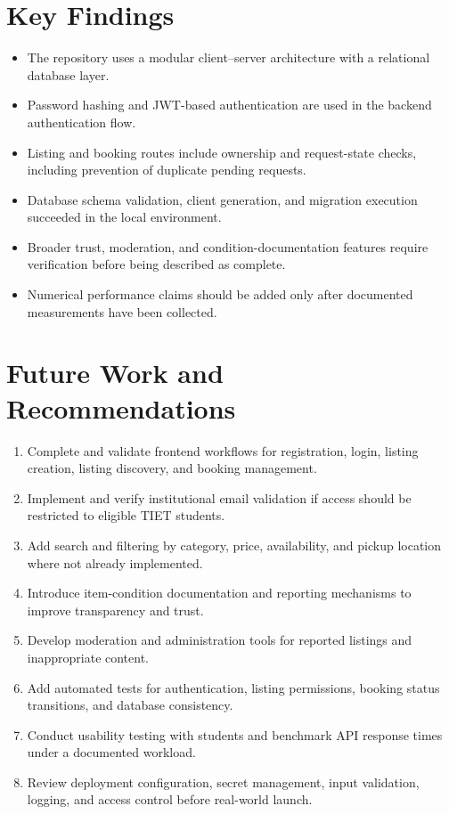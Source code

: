 \documentclass{tietreport}
\begin{document}
\section{Key Findings}
\begin{itemize}
  \item The repository uses a modular client--server architecture with a relational database layer.
  \item Password hashing and JWT-based authentication are used in the backend authentication flow.
  \item Listing and booking routes include ownership and request-state checks, including prevention of duplicate pending requests.
  \item Database schema validation, client generation, and migration execution succeeded in the local environment.
  \item Broader trust, moderation, and condition-documentation features require verification before being described as complete.
  \item Numerical performance claims should be added only after documented measurements have been collected.
\end{itemize}

\section{Future Work and Recommendations}
\begin{enumerate}
  \item Complete and validate frontend workflows for registration, login, listing creation, listing discovery, and booking management.
  \item Implement and verify institutional email validation if access should be restricted to eligible TIET students.
  \item Add search and filtering by category, price, availability, and pickup location where not already implemented.
  \item Introduce item-condition documentation and reporting mechanisms to improve transparency and trust.
  \item Develop moderation and administration tools for reported listings and inappropriate content.
  \item Add automated tests for authentication, listing permissions, booking status transitions, and database consistency.
  \item Conduct usability testing with students and benchmark API response times under a documented workload.
  \item Review deployment configuration, secret management, input validation, logging, and access control before real-world launch.
\end{enumerate}
\end{document}
